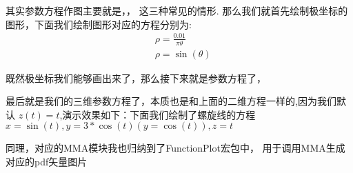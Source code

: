 其实参数方程作图主要就是，，
这三种常见的情形.
那么我们就首先绘制极坐标的图形，下面我们绘制图形对应的方程分别为:
\begin{align}
    & \rho = \frac{0.01}{\pi \theta}\\
    & \rho = \sin(\theta)
\end{align}
\margin


\begin{center}
\end{center}


既然极坐标我们能够画出来了，那么接下来就是参数方程了，
\begin{center}
\end{center}

最后就是我们的三维参数方程了，本质也是和上面的二维方程一样的,因为我们默认
$z(t) = t$,演示效果如下：下面我们绘制了螺旋线的方程 $x=\sin(t),y=3*\cos(t)(y=\cos(t)),z=t$
\begin{center}
\end{center}

同理，对应的MMA模块我也归纳到了FunctionPlot宏包中，
用于调用MMA生成对应的pdf矢量图片

